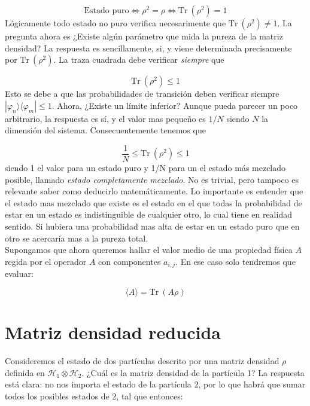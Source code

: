 \documentclass[12pt]{book}
\numberwithin{equation}{chapter}
\numberwithin{figure}{chapter}
\newcommand{\Tr}{\mathrm{Tr} \ }
\newcommand{\Hcal}{\mathcal{H}}
\begin{document}
\begin{equation}
\text{Estado puro} \Longleftrightarrow \rho^2 = \rho \Longleftrightarrow \Tr  (\rho^2) = 1
\end{equation} 
Lógicamente todo estado no puro verifica necesarimente que $\Tr (\rho^2)  \neq 1$. La pregunta ahora es ¿Existe algún parámetro que mida la pureza de la matriz densidad? La respuesta es sencillamente, si, y viene determinada precisamente por $\Tr (\rho^2)$. La traza cuadrada debe verificar \textit{siempre} que

\begin{equation}
\Tr (\rho^2) \leq 1
\end{equation}
Esto se debe a que las probabilidades de transición deben verificar siempre $|\varphi_n \rangle \langle \varphi_m | \leq 1$. Ahora, ¿Existe un límite inferior? Aunque pueda parecer un poco arbitrario, la respuesta es sí, y el valor mas pequeño es $1/N$ siendo $N$ la dimensión del sistema. Consecuentemente tenemos que

\begin{equation}
\frac{1}{N} \leq \Tr (\rho^2) \leq 1
\end{equation}
siendo 1 el valor para un estado puro y 1/N para un el estado más mezclado posible, llamado \textit{estado completamente mezclado}. No es trivial, pero tampoco es relevante saber como deducirlo matemáticamente. Lo importante es entender que el estado mas mezclado que existe es el estado en el que todas la probabilidad de estar en un estado es indistinguible de cualquier otro, lo cual tiene en realidad sentido. Si hubiera una probabilidad mas alta de estar en un estado puro que en otro se acercaría mas a la pureza total. \\

Supongamos que ahora queremos hallar el valor medio de una propiedad física $A$ regida por el operador $A$ con componentes $a_{i,j}$. En ese caso solo tendremos que evaluar:

\begin{equation}
\langle A \rangle = \Tr (A \rho)
\end{equation}

\section{Matriz densidad reducida}

Consideremos el estado de dos partículas descrito por una matriz densidad $\rho$ definida en $\Hcal_1 \otimes \Hcal_2$. ¿Cuál es la matriz densidad de la partícula 1? La respuesta está clara: no nos importa el estado de la partícula 2, por lo que habrá que sumar todos los posibles estados de $2$, tal que entonces:
\end{document}
